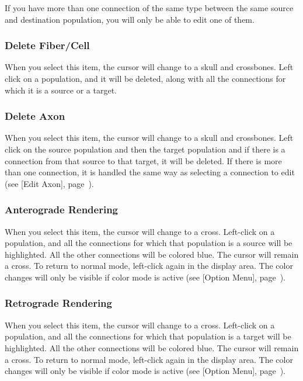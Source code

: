 \documentclass[12pt,openany,oneside]{book}
\newcommand{\tipxref}[1]{see [#1], page~\pageref{#1}}
\begin{document}
If you have more than one connection of the same type between the same
source and destination population, you will only be able to edit one
of them.

\subsubsection*{Delete Fiber/Cell}

When you select this item, the cursor will change to a skull and
crossbones.  Left click on a population, and it will be deleted, along
with all the connections for which it is a source or a target.

\subsubsection*{Delete Axon}

When you select this item, the cursor will change to a skull and
crossbones.  Left click on the source population and then the target
population and if there is a connection from that source to that
target, it will be deleted.  If there is more than one connection, it
is handled the same way as selecting a connection to edit (\tipxref{Edit Axon}).

\subsubsection*{Anterograde Rendering}

When you select this item, the cursor will change to a cross.
Left-click on a population, and all the connections for which that
population is a source will be highlighted.  All the other connections
will be colored blue.  The cursor will remain a cross.  To return to
normal mode, left-click again in the display area.  The color changes
will only be visible if color mode is active (\tipxref{Option Menu}).

\subsubsection*{Retrograde Rendering}

When you select this item, the cursor will change to a cross.
Left-click on a population, and all the connections for which that
population is a target will be highlighted.  All the other connections
will be colored blue.  The cursor will remain a cross.  To return to
normal mode, left-click again in the display area.  The color changes
will only be visible if color mode is active (\tipxref{Option Menu}).
\end{document}
